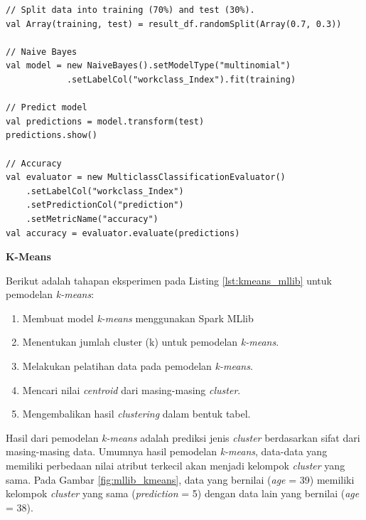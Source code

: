 \documentclass[a4paper,twoside]{article}
\begin{document}
\begin{enumerate}
\begin{lstlisting}[basicstyle=\ttfamily, frame=single,
	columns=fullflexible, keepspaces=true, breaklines=true, label=lst:naivebayes_mllib, caption=Eksperimen Naive Bayes Spark MLlib]
// Split data into training (70%) and test (30%).
val Array(training, test) = result_df.randomSplit(Array(0.7, 0.3))

// Naive Bayes
val model = new NaiveBayes().setModelType("multinomial")
			.setLabelCol("workclass_Index").fit(training)
			
// Predict model
val predictions = model.transform(test)
predictions.show()

// Accuracy
val evaluator = new MulticlassClassificationEvaluator()
	.setLabelCol("workclass_Index")
	.setPredictionCol("prediction")
	.setMetricName("accuracy")
val accuracy = evaluator.evaluate(predictions)

\end{lstlisting}

\newpage
\textbf{K-Means}

\noindent Berikut adalah tahapan eksperimen pada Listing \ref{lst:kmeans_mllib} untuk pemodelan \textit{k-means}:
\begin{enumerate}
\item Membuat model \textit{k-means} menggunakan Spark MLlib
\item Menentukan jumlah cluster (k) untuk pemodelan \textit{k-means}.
\item Melakukan pelatihan data pada pemodelan \textit{k-means}.
\item Mencari nilai \textit{centroid} dari masing-masing \textit{cluster}.
\item Mengembalikan hasil \textit{clustering} dalam bentuk tabel.

\end{enumerate}	


\par Hasil dari pemodelan \textit{k-means} adalah prediksi jenis \textit{cluster} berdasarkan sifat dari masing-masing data. Umumnya hasil pemodelan \textit{k-means}, data-data yang memiliki perbedaan nilai atribut terkecil akan menjadi kelompok \textit{cluster} yang sama. Pada Gambar \ref{fig:mllib_kmeans}, data yang bernilai (\textit{age} = 39) memiliki kelompok \textit{cluster} yang sama (\textit{prediction} = 5) dengan data lain yang bernilai (\textit{age} = 38).


\end{enumerate}
\end{document}
